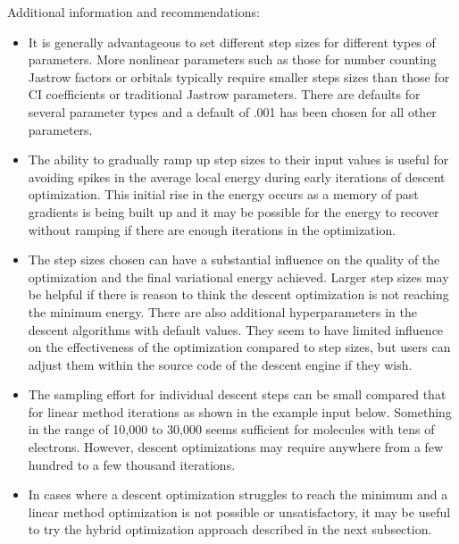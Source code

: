 Additional information and recommendations:
\begin{itemize}

    \item It is generally advantageous to set different step sizes for different types of parameters.
	More nonlinear parameters such as those for number counting Jastrow factors or orbitals typically require
	smaller steps sizes than those for CI coefficients or traditional Jastrow parameters. There are defaults for 
	several parameter types and a default of .001 has been chosen for all other parameters.
    \item The ability to gradually ramp up step sizes to their input values is useful for avoiding spikes in the average local energy
	during early iterations of descent optimization. This initial rise in the energy occurs as a memory of past gradients is being
	built up and it may be possible for the energy to recover without ramping if there are enough iterations in the optimization.
    \item The step sizes chosen can have a substantial influence on the quality of the optimization and the final variational energy achieved.
	Larger step sizes may be helpful if there is reason to think the descent optimization is not reaching the minimum energy. There are also
	additional hyperparameters in the descent algorithms with default values.\cite{Otis2019} They seem to have limited influence
	on the effectiveness of the optimization compared to step sizes, but users can adjust them within the source code of the descent engine if they wish.
    \item The sampling effort for individual descent steps can be small compared that for linear method iterations as shown in the example input below. Something in the range of 10,000 to 30,000
	seems sufficient for molecules with tens of electrons. However, descent optimizations may require anywhere from a few hundred to a few thousand iterations.
    \item In cases where a descent optimization struggles to reach the minimum and a linear method optimization is not possible or unsatisfactory, it may be useful to try
	the hybrid optimization approach described in the next subsection.
\end{itemize}

